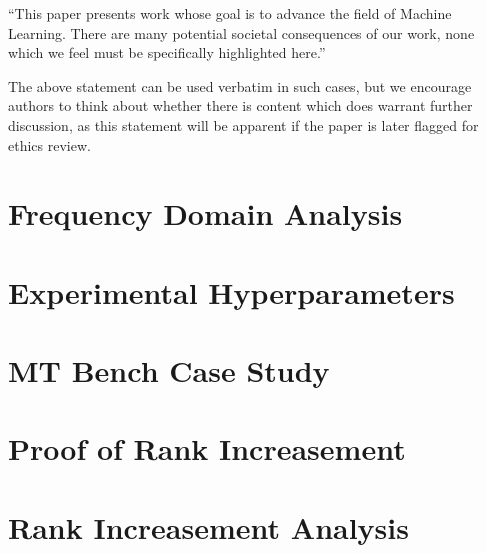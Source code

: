 \documentclass{article}
\theoremstyle{plain}
\theoremstyle{definition}
\theoremstyle{remark}
\begin{document}
``This paper presents work whose goal is to advance the field of 
Machine Learning. There are many potential societal consequences 
of our work, none which we feel must be specifically highlighted here.''

The above statement can be used verbatim in such cases, but we 
encourage authors to think about whether there is content which does 
warrant further discussion, as this statement will be apparent if the 
paper is later flagged for ethics review.


\nocite{langley00}





\newpage
\appendix
\onecolumn

\section{Frequency Domain Analysis}

\section{Experimental Hyperparameters}

\section{MT Bench Case Study}

\section{Proof of Rank Increasement}


\section{Rank Increasement Analysis}
\label{appendix:rank_increasement}
\end{document}
